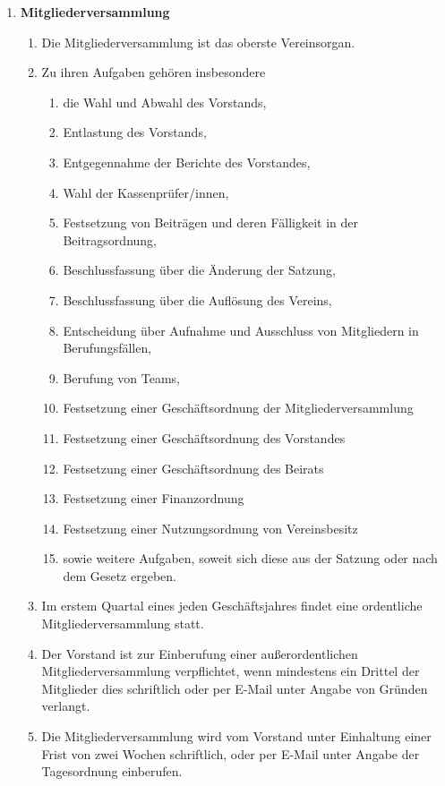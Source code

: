 \documentclass[german]{article}
\newcommand{\paragr}[1]{\item \textsf{\textbf{#1}}}
\begin{document}
\begin{enumerate}
\paragr{Mitgliederversammlung}
\begin{enumerate}

\item Die Mitgliederversammlung ist das oberste Vereinsorgan.

\item Zu ihren Aufgaben gehören insbesondere
\begin{enumerate}
\item die Wahl und Abwahl des Vorstands,
\item Entlastung des Vorstands,
\item Entgegennahme der Berichte des Vorstandes,
\item Wahl der Kassenprüfer/innen,
\item Festsetzung von Beiträgen und deren Fälligkeit in der Beitragsordnung,
\item Beschlussfassung über die Änderung der Satzung,
\item Beschlussfassung über die Auflösung des Vereins,
\item Entscheidung über Aufnahme und Ausschluss von Mitgliedern in Berufungsfällen,
\item Berufung von Teams,
\item Festsetzung einer Geschäftsordnung der Mitgliederversammlung
\item Festsetzung einer Geschäftsordnung des Vorstandes
\item Festsetzung einer Geschäftsordnung des Beirats
\item Festsetzung einer Finanzordnung
\item Festsetzung einer Nutzungsordnung von Vereinsbesitz
\item sowie weitere Aufgaben, soweit sich diese aus der Satzung oder nach dem Gesetz ergeben.
\end{enumerate}
\item Im erstem Quartal eines jeden Geschäftsjahres findet eine ordentliche Mitgliederversammlung statt.

\item Der Vorstand ist zur Einberufung einer außerordentlichen Mitgliederversammlung verpflichtet, wenn mindestens ein Drittel der Mitglieder dies schriftlich oder per E-Mail unter Angabe von Gründen verlangt.

\item Die Mitgliederversammlung wird vom Vorstand unter Einhaltung einer Frist von zwei Wochen schriftlich, oder per E-Mail unter Angabe der Tagesordnung einberufen.


\end{enumerate}
\end{enumerate}
\end{document}
